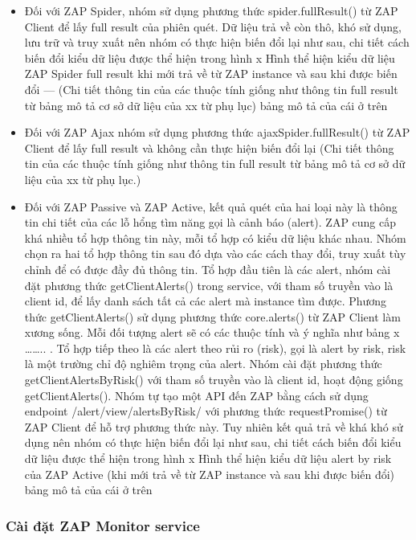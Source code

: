 \begin{itemize}
  \item Đối với ZAP Spider, nhóm sử dụng phương thức spider.fullResult() từ ZAP Client để lấy full result của phiên quét.
        Dữ liệu trả về còn thô, khó sử dụng, lưu trữ và truy xuất nên nhóm có thực hiện biến đổi lại như sau, chi tiết cách biến đổi kiểu dữ liệu được thể hiện trong hình x Hình thể hiện kiểu dữ liệu ZAP Spider full result khi mới trả về từ ZAP instance và sau khi được biến đổi --- (Chi tiết thông tin của các thuộc tính giống như thông tin full result từ bảng mô tả cơ sở dữ liệu của xx từ phụ lục)
        bảng mô tả của cái ở trên

  \item Đối với ZAP Ajax nhóm sử dụng phương thức ajaxSpider.fullResult() từ ZAP Client để lấy full result và không cần thực hiện biến đổi lại (Chi tiết thông tin của các thuộc tính giống như thông tin full result từ bảng mô tả cơ sở dữ liệu của xx từ phụ lục.)
  \item Đối với ZAP Passive và ZAP Active, kết quả quét của hai loại này là thông tin chi tiết của các lỗ hổng tìm năng gọi là cảnh báo (alert). ZAP cung cấp khá nhiều tổ hợp thông tin này, mỗi tổ hợp có kiểu dữ liệu khác nhau. Nhóm chọn ra hai tổ hợp thông tin sau đó dựa vào các cách thay đổi, truy xuất tùy chỉnh để có được đầy đủ thông tin. Tổ hợp đầu tiên là các alert, nhóm cài đặt phương thức getClientAlerts() trong service, với tham số truyền vào là client id, để lấy danh sách tất cả các alert mà instance tìm được. Phương thức getClientAlerts() sử dụng phương thức core.alerts() từ ZAP Client làm xương sống. Mỗi đối tượng alert sẽ có các thuộc tính và ý nghĩa như bảng x …….. . Tổ hợp tiếp theo là các alert theo rủi ro (risk), gọi là alert by risk, risk là một trường chỉ độ nghiêm trọng của alert. Nhóm cài đặt phương thức getClientAlertsByRisk() với tham số truyền vào là client id, hoạt động giống getClientAlerts(). Nhóm tự tạo một API đến ZAP bằng cách sử dụng endpoint /alert/view/alertsByRisk/ với phương thức requestPromise() từ ZAP Client để hỗ trợ phương thức này. Tuy nhiên kết quả trả về khá khó sử dụng nên nhóm có thực hiện biến đổi lại như sau, chi tiết cách biến đổi kiểu dữ liệu được thể hiện trong hình x Hình thể hiện kiểu dữ liệu alert by risk của ZAP Active (khi mới trả về từ ZAP instance và sau khi được biến đổi)
        bảng mô tả của cái ở trên
\end{itemize}

\subsubsection{Cài đặt ZAP Monitor service}

